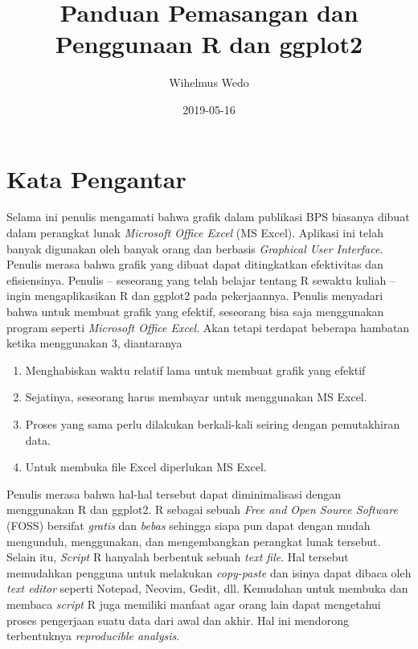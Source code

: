 \documentclass[]{book}
\title{Panduan Pemasangan dan Penggunaan R dan ggplot2}
\author{Wihelmus Wedo}
\date{2019-05-16}
\providecommand{\tightlist}{%
  \setlength{\itemsep}{0pt}\setlength{\parskip}{0pt}}
\begin{document}
\maketitle

{
\setcounter{tocdepth}{1}
\tableofcontents
}
\chapter*{Kata Pengantar}\label{kata-pengantar}

Selama ini penulis mengamati bahwa grafik dalam publikasi BPS biasanya
dibuat dalam perangkat lunak \emph{Microsoft Office Excel} (MS Excel).
Aplikasi ini telah banyak digunakan oleh banyak orang dan berbasis
\emph{Graphical User Interface}. Penulis merasa bahwa grafik yang dibuat
dapat ditingkatkan efektivitas dan efisiensinya. Penulis -- seseorang
yang telah belajar tentang R sewaktu kuliah -- ingin mengaplikasikan R
dan ggplot2 pada pekerjaannya. Penulis menyadari bahwa untuk membuat
grafik yang efektif, seseorang bisa saja menggunakan program seperti
\emph{Microsoft Office Excel}. Akan tetapi terdapat beberapa hambatan
ketika menggunakan 3, diantaranya

\begin{enumerate}
\def\labelenumi{\arabic{enumi}.}
\tightlist
\item
  Menghabiskan waktu relatif lama untuk membuat grafik yang efektif
\item
  Sejatinya, seseorang harus membayar untuk menggunakan MS Excel.
\item
  Proses yang sama perlu dilakukan berkali-kali seiring dengan
  pemutakhiran data.
\item
  Untuk membuka file Excel diperlukan MS Excel.
\end{enumerate}

Penulis merasa bahwa hal-hal tersebut dapat diminimalisasi dengan
menggunakan R dan ggplot2. R sebagai sebuah \emph{Free and Open Source
Software} (FOSS) bersifat \emph{gratis} dan \emph{bebas} sehingga siapa
pun dapat dengan mudah mengunduh, menggunakan, dan mengembangkan
perangkat lunak tersebut. Selain itu, \emph{Script} R hanyalah berbentuk
sebuah \emph{text file}. Hal tersebut memudahkan pengguna untuk
melakukan \emph{copy-paste} dan isinya dapat dibaca oleh \emph{text
editor} seperti Notepad, Neovim, Gedit, dll. Kemudahan untuk membuka dan
membaca \emph{script} R juga memiliki manfaat agar orang lain dapat
mengetahui proses pengerjaan suatu data dari awal dan akhir. Hal ini
mendorong terbentuknya \emph{reproducible analysis}.
\end{document}
